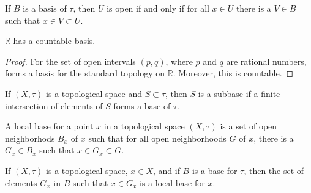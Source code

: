     \begin{theorem}
        If $B$ is a basis of $\tau$, then
        $U$ is open if and only if for all
        $x\in{U}$ there is a $V\in{B}$ such that
        $x\in{V}\subset{U}$.
    \end{theorem}
    \begin{theorem}
        $\mathbb{R}$ has a countable basis.
    \end{theorem}
    \begin{proof}
        For the set of open intervals
        $(p,q)$, where $p$ and $q$ are rational
        numbers, forms a basis for the standard
        topology on $\mathbb{R}$. Moreover, this
        is countable.
    \end{proof}
    \begin{definition}
        If $(X,\tau)$ is a topological space
        and $S\subset\tau$, then $S$ is a subbase
        if a finite intersection of elements of $S$
        forms a base of $\tau$.
    \end{definition}
    \begin{definition}
        A local base for a point
        $x$ in a topological space $(X,\tau)$
        is a set of open neighborhods $B_{x}$ of
        $x$ such that for all open neighborhoods $G$
        of $x$, there is a $G_{x}\in{B_{x}}$ such that
        $x\in{G_{x}}\subset{G}$.
    \end{definition}
    \begin{theorem}
        If $(X,\tau)$ is a topological space, $x\in{X}$,
        and if $B$ is a base for $\tau$, then
        the set of elements $G_{x}$ in $B$ such that
        $x\in{G_{x}}$ is a local base for $x$.
    \end{theorem}
